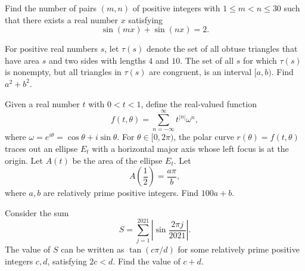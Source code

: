 \documentclass[11pt]{article}
\theoremstyle{definition}
\begin{document}
\begin{question}[name={2021 AIME I, \href{https://artofproblemsolving.com/community/c4p20872572}{Problem 7}}]
	Find the number of pairs $(m,n)$ of positive integers with $1\le m<n\le 30$ such that there exists a real number $x$ satisfying $$\sin(mx)+\sin(nx)=2.$$
\end{question}


%	


















\begin{question}[name={2021 AIME II, \href{https://artofproblemsolving.com/community/c4p21026709}{Problem 5}}]
	For positive real numbers $s$, let $\tau(s)$ denote the set of all obtuse triangles that have area $s$ and two sides with lengths $4$ and $10$. The set of all $s$ for which $\tau(s)$ is nonempty, but all triangles in $\tau(s)$ are congruent, is an interval $[a,b)$. Find $a^2+b^2$.
\end{question}


%	


\begin{question}[name={2021 PUMaC, Team Round, \href{https://artofproblemsolving.com/community/c4p24986107}{Problem 5}}]
	Given a real number $t$ with $0 < t < 1$, define the real-valued function $$f(t, \theta) = \sum^{\infty}_{n=-\infty} t^{|n|}\omega^n,$$ where $\omega = e^{i \theta} = \cos  \theta + i\sin  \theta$. For $\theta \in [0, 2\pi)$, the polar curve $r(\theta) = f(t, \theta)$ traces out an ellipse $E_t$ with a horizontal major axis whose left focus is at the origin. Let $A(t)$ be the area of the ellipse $E_t$. Let $$A\left( \frac12 \right) = \frac{a\pi}{b},$$ where $a, b$ are relatively prime positive integers. Find $100a +b$.
\end{question}






\begin{question}[name={2021 PUMaC, Algebra, \href{https://artofproblemsolving.com/community/c4p25094276}{Problem 5}}]
	Consider the sum$$S =\sum^{2021}_{j=1} \left|\sin \frac{2\pi j}{2021}\right|.$$The value of $S$ can be written as $\tan \left( {c\pi}/{d} \right)$ for some relatively prime positive integers $c, d$, satisfying $2c < d$. Find the value of $c + d$.
\end{question}
\end{document}
